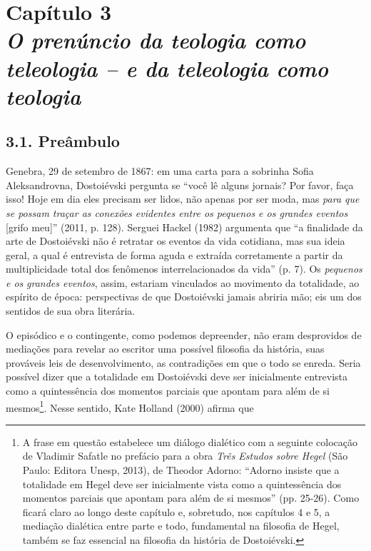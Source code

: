 \thispagestyle{empty}

\chapter*{Capítulo 3\\
\bigskip
\emph{O prenúncio da teologia como teleologia -- e da teleologia como teologia}}


\section{3.1. Preâmbulo}

Genebra, 29 de setembro de 1867: em uma carta para a sobrinha Sofia
Aleksandrovna, Dostoiévski pergunta se ``você lê alguns jornais? Por
favor, faça isso! Hoje em dia eles precisam ser lidos, não apenas por
ser moda, mas \emph{para que se possam traçar as conexões evidentes
entre os pequenos e os grandes eventos} {[}grifo meu{]}'' (2011, p.
128). Serguei Hackel (1982) argumenta que ``a finalidade da arte de
Dostoiévski não é retratar os eventos da vida cotidiana, mas sua ideia
geral, a qual é entrevista de forma aguda e extraída corretamente a
partir da multiplicidade total dos fenômenos interrelacionados da vida''
(p. 7). Os \emph{pequenos e os} \emph{grandes eventos}, assim, estariam
vinculados ao movimento da totalidade, ao espírito de época:
perspectivas de que Dostoiévski jamais abriria mão; eis um dos sentidos
de sua obra literária.

O episódico e o contingente, como podemos depreender, não eram
desprovidos de mediações para revelar ao escritor uma possível filosofia
da história, suas prováveis leis de desenvolvimento, as contradições em
que o todo se enreda. Seria possível dizer que a totalidade em
Dostoiévski deve ser inicialmente entrevista como a quintessência dos
momentos parciais que apontam para além de si mesmos\footnote{A frase em
  questão estabelece um diálogo dialético com a seguinte colocação de
  Vladimir Safatle no prefácio para a obra \emph{Três Estudos sobre
  Hegel} (São Paulo: Editora Unesp, 2013), de Theodor Adorno: ``Adorno
  insiste que a totalidade em Hegel deve ser inicialmente vista como a
  quintessência dos momentos parciais que apontam para além de si
  mesmos'' (pp. 25-26). Como ficará claro ao longo deste capítulo e,
  sobretudo, nos capítulos 4 e 5, a mediação dialética entre parte e
  todo, fundamental na filosofia de Hegel, também se faz essencial na
  filosofia da história de Dostoiévski.}. Nesse sentido, Kate Holland
(2000) afirma que

